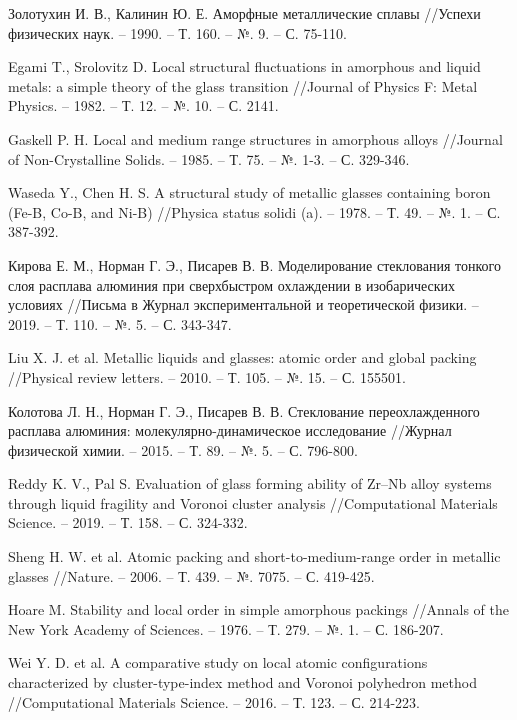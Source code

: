 \documentclass[master,14pt,subf,href,colorlinks=true]{disser}
\begin{document}
\begin{thebibliography}{44}
	Золотухин И. В., Калинин Ю. Е. Аморфные металлические сплавы //Успехи физических наук. – 1990. – Т. 160. – №. 9. – С. 75-110.
	
	Egami T., Srolovitz D. Local structural fluctuations in amorphous and liquid metals: a simple theory of the glass transition //Journal of Physics F: Metal Physics. – 1982. – Т. 12. – №. 10. – С. 2141.
	
	Gaskell P. H. Local and medium range structures in amorphous alloys //Journal of Non-Crystalline Solids. – 1985. – Т. 75. – №. 1-3. – С. 329-346.
	
	Waseda Y., Chen H. S. A structural study of metallic glasses containing boron (Fe-B, Co-B, and Ni-B) //Physica status solidi (a). – 1978. – Т. 49. – №. 1. – С. 387-392.
	
	Кирова Е. М., Норман Г. Э., Писарев В. В. Моделирование стеклования тонкого слоя расплава алюминия при сверхбыстром охлаждении в изобарических условиях //Письма в Журнал экспериментальной и теоретической физики. – 2019. – Т. 110. – №. 5. – С. 343-347.
	
	Liu X. J. et al. Metallic liquids and glasses: atomic order and global packing //Physical review letters. – 2010. – Т. 105. – №. 15. – С. 155501.
	
	Колотова Л. Н., Норман Г. Э., Писарев В. В. Стеклование переохлажденного расплава алюминия: молекулярно-динамическое исследование //Журнал физической химии. – 2015. – Т. 89. – №. 5. – С. 796-800.
	
	Reddy K. V., Pal S. Evaluation of glass forming ability of Zr–Nb alloy systems through liquid fragility and Voronoi cluster analysis //Computational Materials Science. – 2019. – Т. 158. – С. 324-332.
	
	Sheng H. W. et al. Atomic packing and short-to-medium-range order in metallic glasses //Nature. – 2006. – Т. 439. – №. 7075. – С. 419-425.
	
	Hoare M. Stability and local order in simple amorphous packings //Annals of the New York Academy of Sciences. – 1976. – Т. 279. – №. 1. – С. 186-207.
	
	Wei Y. D. et al. A comparative study on local atomic configurations characterized by cluster-type-index method and Voronoi polyhedron method //Computational Materials Science. – 2016. – Т. 123. – С. 214-223.
	

\end{thebibliography}
\end{document}
